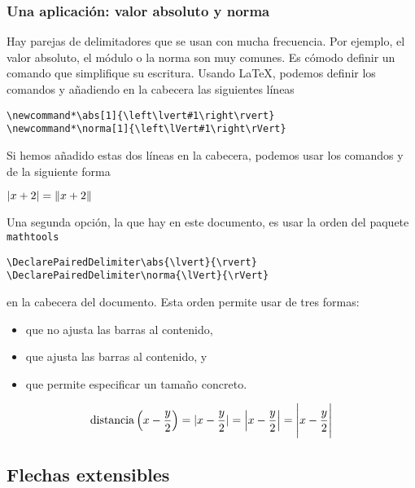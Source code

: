 \documentclass{article}
\numberwithin{equation}{section}
\DeclareMathOperator{\dist}{distancia}
\DeclarePairedDelimiter\abs{\lvert}{\rvert}
\DeclarePairedDelimiter\norma{\lVert}{\rVert}
\theoremstyle{plain}
\theoremstyle{definition}
\theoremstyle{remark}
\begin{document}
\subsubsection*{Una aplicación: valor absoluto y norma}

Hay parejas de delimitadores que se usan con mucha frecuencia. Por ejemplo, el valor absoluto, el módulo o la norma son muy comunes. Es cómodo definir un comando que simplifique su escritura. Usando \LaTeX{}, podemos definir los comandos \texttt{\abs} y \texttt{\norma} añadiendo en la cabecera las siguientes líneas
\begin{verbatim}
\newcommand*\abs[1]{\left\lvert#1\right\rvert}
\newcommand*\norma[1]{\left\lVert#1\right\rVert}
\end{verbatim}
Si hemos añadido estas dos líneas en la cabecera, podemos usar los comandos \texttt{\abs} y \texttt{\norma} de la siguiente forma
\begin{codigo-lado}
$\abs{x+2} = \norma{x+2}$
\end{codigo-lado}


Una segunda opción, la que hay en este documento, es usar la orden \texttt{\DeclarePairedDelimiter} del paquete \texttt{mathtools}
\begin{verbatim}
\DeclarePairedDelimiter\abs{\lvert}{\rvert}
\DeclarePairedDelimiter\norma{\lVert}{\rVert}
\end{verbatim}
en la cabecera del documento. Esta orden permite usar \texttt{\abs} de tres formas:
\begin{itemize}
	\item \texttt{} que no ajusta las barras al contenido,
	\item \texttt{} que ajusta las barras al contenido, y
	\item \texttt{} que permite especificar un tamaño concreto.
\end{itemize}
\begin{codigo-arriba}
	\[\dist \left(x-\frac{y}{2} \right)
	=\abs{x-\frac{y}{2}}
	=\abs*{x-\frac{y}{2}}
	=\abs[\Bigg]{x-\frac{y}{2}}\]
\end{codigo-arriba}



\subsection{Flechas extensibles}
\end{document}
